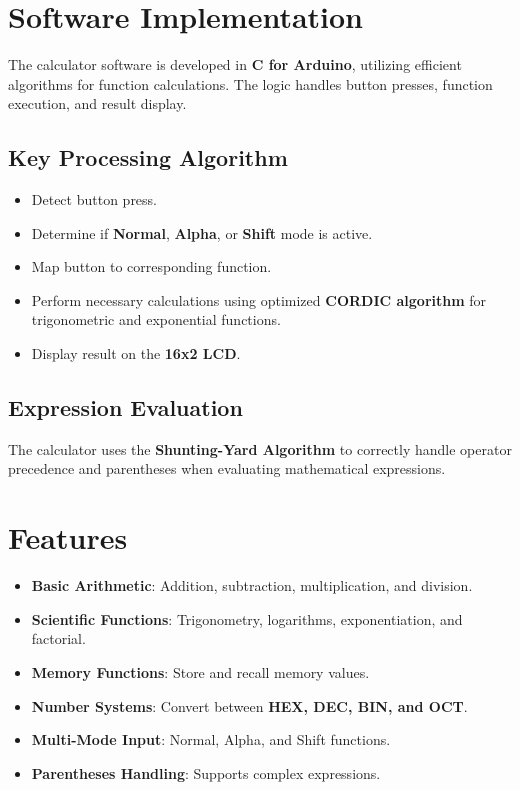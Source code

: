 \documentclass[journal]{IEEEtran}
\numberwithin{equation}{enumi}
\numberwithin{figure}{enumi}
\begin{document}
\section*{Software Implementation}
The calculator software is developed in \textbf{C for Arduino}, utilizing efficient algorithms for function calculations. The logic handles button presses, function execution, and result display.

\subsection{Key Processing Algorithm}
\begin{itemize}
\item Detect button press.
\item Determine if \textbf{Normal}, \textbf{Alpha}, or \textbf{Shift} mode is active.
\item Map button to corresponding function.
\item Perform necessary calculations using optimized \textbf{CORDIC algorithm} for trigonometric and exponential functions.
\item Display result on the \textbf{16x2 LCD}.
\end{itemize}

\subsection{Expression Evaluation}
The calculator uses the \textbf{Shunting-Yard Algorithm} to correctly handle operator precedence and parentheses when evaluating mathematical expressions.

\section*{Features}
\begin{itemize}
\item \textbf{Basic Arithmetic}: Addition, subtraction, multiplication, and division.
\item \textbf{Scientific Functions}: Trigonometry, logarithms, exponentiation, and factorial.
\item \textbf{Memory Functions}: Store and recall memory values.
\item \textbf{Number Systems}: Convert between \textbf{HEX, DEC, BIN, and OCT}.
\item \textbf{Multi-Mode Input}: Normal, Alpha, and Shift functions.
\item \textbf{Parentheses Handling}: Supports complex expressions.
\end{itemize}
\end{document}
